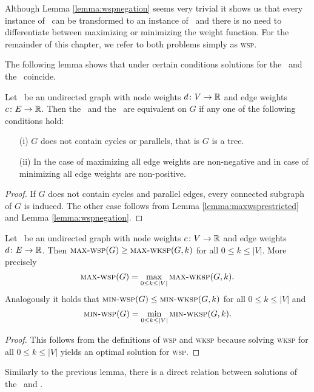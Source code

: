 Although Lemma \ref{lemma:wspnegation} seems very trivial it shows us that every instance of \maxWSP\ can be transformed to an instance of \minWSP\ and there is no need to differentiate between maximizing or minimizing the weight function. For the remainder of this chapter, we refer to both problems simply as \textsc{wsp}.\medskip

The following lemma shows that under certain conditions solutions for the \WSP\ and the \WISP\ coincide.

\begin{lemma}
	\label{lemma:wspwisp}
	Let \ugraph\ be an undirected graph with node weights $d \colon V \to \mathbb{R}$ and edge weights $c \colon E \to \mathbb{R}$. Then the \WSP\ and the \WISP\ are equivalent on $G$ if any one of the following conditions hold:
	\begin{itemize}
		\item[(i)] $G$ does not contain cycles or parallels, that is $G$ is a tree.
		\item[(ii)] In the case of maximizing all edge weights are non-negative and in case of minimizing all edge weights are non-positive.
	\end{itemize}
\end{lemma}
\begin{proof}
	If $G$ does not contain cycles and parallel edges, every connected subgraph of $G$ is induced. The other case follows from Lemma \ref{lemma:maxwsprestricted} and Lemma \ref{lemma:wspnegation}.
\end{proof}

\begin{lemma}
	\label{lemma:wksp}
	Let \ugraph\ be an undirected graph with node weights $c\colon V \to \mathbb{R}$ and edge weights $d\colon E \to \mathbb{R}$. Then $\text{\textsc{max-wsp}}(G) \geq \text{\textsc{max-wksp}}(G, k)$ for all $0 \leq k \leq |V|$. More precisely
	$$ \text{\textsc{max-wsp}}(G) = \max_{0 \leq k \leq |V|} \text{\textsc{max-wksp}}(G, k).$$
	Analogously it holds that $\text{\textsc{min-wsp}}(G) \leq \text{\textsc{min-wksp}}(G, k)$ for all $0 \leq k \leq |V|$ and
	$$ \text{\textsc{min-wsp}}(G) = \min_{0 \leq k \leq |V|} \text{\textsc{min-wksp}}(G, k).$$
\end{lemma}
\begin{proof}
	This follows from the definitions of \textsc{wsp} and \textsc{wksp} because solving \textsc{wksp} for all $0 \leq k \leq |V|$ yields an optimal solution for \textsc{wsp}.
\end{proof}

Similarly to the previous lemma, there is a direct relation between solutions of the \WSP\ and \RWSP.


